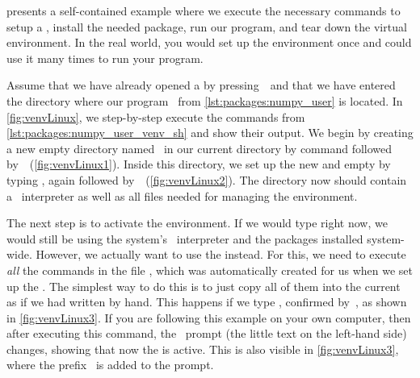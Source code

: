 %
 presents a self-contained example where we execute the necessary commands to setup a , install the needed package, run our program, and tear down the virtual environment.
In the real world, you would set up the environment once and could use it many times to run your program.

Assume that we have already opened a  by pressing~\ubuntuTerminal\ and that we have entered the directory where our program~ from \cref{lst:packages:numpy_user} is located.
In \cref{fig:venvLinux}, we step-by-step execute the commands from \cref{lst:packages:numpy_user_venv_sh} and show their output.
We begin by creating a new empty directory named~ in our current directory by  command followed by~\keys{\return}~(\cref{fig:venvLinux1}).
Inside this directory, we set up the new and empty  by typing , again followed by~\keys{\return}~(\cref{fig:venvLinux2}).
The directory  now should contain a \python\ interpreter as well as all files needed for managing the environment.

The next step is to activate the environment.
If we would type  right now, we would still be using the system's \python\ interpreter and the packages installed system-wide.
However, we actually want to use the  instead.
For this, we need to execute \emph{all} the commands in the file , which was automatically created for us when we set up the .
The simplest way to do this is to just copy all of them into the current  as if we had written by hand.
This happens if we type , confirmed by~\keys{\return}, as shown in \cref{fig:venvLinux3}.
If you are following this example on your own computer, then after executing this command, the \bash\ prompt (the little text on the left-hand side) changes, showing that now the  is active.
This is also visible in \cref{fig:venvLinux3}, where the prefix~ is added to the prompt.

